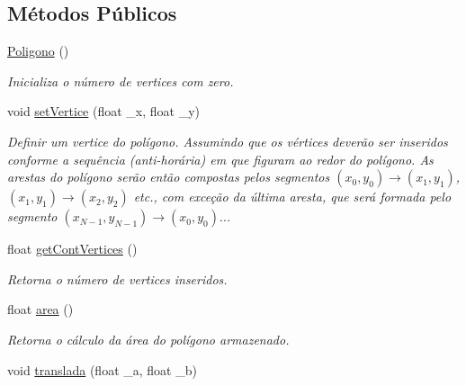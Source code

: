 \subsection*{Métodos Públicos}
\begin{DoxyCompactItemize}
\item 
\hyperlink{class_poligono_a9311a9a1496878c09c8508b3636e2870}{Poligono} ()\hypertarget{class_poligono_a9311a9a1496878c09c8508b3636e2870}{}\label{class_poligono_a9311a9a1496878c09c8508b3636e2870}

\begin{DoxyCompactList}\small\item\em Inicializa o número de vertices com zero. \end{DoxyCompactList}\item 
void \hyperlink{class_poligono_a0784e2fb0149f6923a42bfabfb073719}{set\+Vertice} (float \+\_\+x, float \+\_\+y)\hypertarget{class_poligono_a0784e2fb0149f6923a42bfabfb073719}{}\label{class_poligono_a0784e2fb0149f6923a42bfabfb073719}

\begin{DoxyCompactList}\small\item\em Definir um vertice do polígono. Assumindo que os vértices deverão ser inseridos conforme a sequência (anti-\/horária) em que figuram ao redor do polígono. As arestas do polígono serão então compostas pelos segmentos $(x_0,y_0)→(x_1,y_1)$, $(x_1,y_1)→(x_2,y_2)$ etc., com exceção da última aresta, que será formada pelo segmento $(x_{N−1},y_{N−1})→(x_0,y_0)..$. \end{DoxyCompactList}\item 
float \hyperlink{class_poligono_a1ae7255db591e28a3a35293210033811}{get\+Cont\+Vertices} ()\hypertarget{class_poligono_a1ae7255db591e28a3a35293210033811}{}\label{class_poligono_a1ae7255db591e28a3a35293210033811}

\begin{DoxyCompactList}\small\item\em Retorna o número de vertices inseridos. \end{DoxyCompactList}\item 
float \hyperlink{class_poligono_a7f66c446f86c19118663ef1b2c8a4be6}{area} ()\hypertarget{class_poligono_a7f66c446f86c19118663ef1b2c8a4be6}{}\label{class_poligono_a7f66c446f86c19118663ef1b2c8a4be6}

\begin{DoxyCompactList}\small\item\em Retorna o cálculo da área do polígono armazenado. \end{DoxyCompactList}\item 
void \hyperlink{class_poligono_aafacd43b0918e0765fbb42d9aad5bb35}{translada} (float \+\_\+a, float \+\_\+b)\hypertarget{class_poligono_aafacd43b0918e0765fbb42d9aad5bb35}{}\label{class_poligono_aafacd43b0918e0765fbb42d9aad5bb35}


\end{DoxyCompactItemize}
